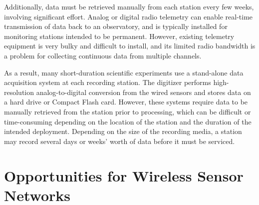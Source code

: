 Additionally, data must be retrieved manually from each station every few
weeks, involving significant effort. Analog or digital radio telemetry can
enable real-time transmission of data back to an observatory, and is
typically installed for monitoring stations intended to be permanent.
However, existing telemetry equipment is very bulky and difficult to install,
and its limited radio bandwidth is a problem for collecting continuous data
from multiple channels.

As a result, many short-duration scientific experiments use a stand-alone
data acquisition system at each recording station. The digitizer performs
high-resolution analog-to-digital conversion from the wired sensors and
stores data on a hard drive or Compact Flash card. However, these systems
require data to be manually retrieved from the station prior to processing,
which can be difficult or time-consuming depending on the location of the
station and the duration of the intended deployment. Depending on the size of
the recording media, a station may record several days or weeks' worth of
data before it must be serviced.

\section{Opportunities for Wireless Sensor Networks}

